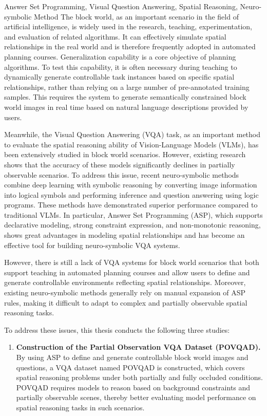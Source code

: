 \begin{englishabstract}{Answer Set Programming, Visual Question Answering, Spatial Reasoning, Neuro-symbolic Method}
The block world, as an important scenario in the field of artificial intelligence, is widely used in the research, teaching, experimentation, and evaluation of related algorithms. It can effectively simulate spatial relationships in the real world and is therefore frequently adopted in automated planning courses. Generalization capability is a core objective of planning algorithms. To test this capability, it is often necessary during teaching to dynamically generate controllable task instances based on specific spatial relationships, rather than relying on a large number of pre-annotated training samples. This requires the system to generate semantically constrained block world images in real time based on natural language descriptions provided by users.

Meanwhile, the Visual Question Answering (VQA) task, as an important method to evaluate the spatial reasoning ability of Vision-Language Models (VLMs), has been extensively studied in block world scenarios. However, existing research shows that the accuracy of these models significantly declines in partially observable scenarios. To address this issue, recent neuro-symbolic methods combine deep learning with symbolic reasoning by converting image information into logical symbols and performing inference and question answering using logic programs. These methods have demonstrated superior performance compared to traditional VLMs. In particular, Answer Set Programming (ASP), which supports declarative modeling, strong constraint expression, and non-monotonic reasoning, shows great advantages in modeling spatial relationships and has become an effective tool for building neuro-symbolic VQA systems.

However, there is still a lack of VQA systems for block world scenarios that both support teaching in automated planning courses and allow users to define and generate controllable environments reflecting spatial relationships. Moreover, existing neuro-symbolic methods generally rely on manual expansion of ASP rules, making it difficult to adapt to complex and partially observable spatial reasoning tasks.

To address these issues, this thesis conducts the following three studies:

\begin{enumerate}[nosep]
\item \textbf{Construction of the Partial Observation VQA Dataset (POVQAD).}  
By using ASP to define and generate controllable block world images and questions, a VQA dataset named POVQAD is constructed, which covers spatial reasoning problems under both partially and fully occluded conditions. POVQAD requires models to reason based on background constraints and partially observable scenes, thereby better evaluating model performance on spatial reasoning tasks in such scenarios.


\end{enumerate}
\end{englishabstract}
